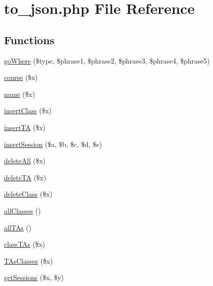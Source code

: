 \hypertarget{to__json_8php}{\section{to\-\_\-json.\-php File Reference}
\label{to__json_8php}
}
\subsection*{Functions}
\begin{DoxyCompactItemize}
\item 
\hyperlink{to__json_8php_a2ec3eb822151bb489199f60f5b4a0c26}{go\-Where} (\$type, \$phrase1, \$phrase2, \$phrase3, \$phrase4, \$phrase5)
\item 
\hyperlink{to__json_8php_a21a32dfbb386a031c794ef93fc8ebd9e}{course} (\$x)
\item 
\hyperlink{to__json_8php_a3fa12e08db73bac89646ae7423f7517f}{name} (\$x)
\item 
\hyperlink{to__json_8php_a90618313f9abbec5ed1db3be24f6de28}{insert\-Class} (\$x)
\item 
\hyperlink{to__json_8php_a54c8d95fb34384beba3230acdbd7028a}{insert\-T\-A} (\$x)
\item 
\hyperlink{to__json_8php_a455e607a715024aca97e9b488a6c15bc}{insert\-Session} (\$a, \$b, \$c, \$d, \$e)
\item 
\hyperlink{to__json_8php_a54d7604ec0112e70aebb6d812577c972}{delete\-All} (\$x)
\item 
\hyperlink{to__json_8php_ad9d38c29e8671868b316910596c4222e}{delete\-T\-A} (\$x)
\item 
\hyperlink{to__json_8php_a12652b337cd14db60bd40e7aa5e7452f}{delete\-Class} (\$x)
\item 
\hyperlink{to__json_8php_a753d4e599d996d0115b05bb02bb2ce23}{all\-Classes} ()
\item 
\hyperlink{to__json_8php_a9a1487ee9e5f545418a96dbbdf190af3}{all\-T\-As} ()
\item 
\hyperlink{to__json_8php_a1b3f36f129e6fc976dc1b9fdb61fad81}{class\-T\-As} (\$x)
\item 
\hyperlink{to__json_8php_a0f2f2e2d57b098205d2ee4226a69cd43}{T\-As\-Classes} (\$x)
\item 
\hyperlink{to__json_8php_a338ed5451916d357e95a2b1ae26232d8}{get\-Sessions} (\$x, \$y)
\end{DoxyCompactItemize}


